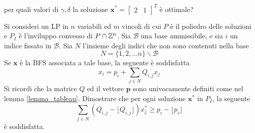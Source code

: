 \documentclass[10pt, letterpaper]{report}
\newcommand{\x}{{\mathbf{x}}}
\begin{document}
per quali valori di $\gamma,\delta$ la soluzione $\x^*=\begin{bmatrix}
    2 & 1
\end{bmatrix}^T$ è ottimale?
\begin{esercizio}
\end{esercizio}
Si consideri un LP in $n$ variabili ed $m$ vincoli di cui $P$ è il poliedro delle soluzioni e $P_I$ è l'inviluppo convesso di $P\cap {\mathbb Z}^n$. Sia $\mathcal B$ una base ammissibile, e sia $i$ un indice fissato in $\mathcal B$. Sia $N$ l'insieme degli indici che non sono contenuti nella base 
$$N=\{1,2,\dots n\}\backslash\mathcal B $$
 Se $\x$ è la BFS associata a tale base, la seguente è soddisfatta 
$$ x_i=p_i+\sum_{j\in N}Q_{i,j}x_j$$
Si ricordi che la matrice $Q$ ed il vettore $\mathbf p$ sono univocamente definiti come nel lemma \ref{lemma_tableau}. Dimostrare che per ogni soluzione $\x^*$ in $P_I$, la seguente 
$$\sum_{j\in N}(Q_{i,j}-\lfloor Q_{i,j}\rfloor)x^*_j\ge p_i-\lfloor p_i\rfloor $$
è soddisfatta.
\end{document}
